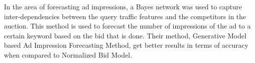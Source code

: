 In the area of forecasting ad impressions, a Bayes network was used to capture
inter-dependencies between the query traffic features and the competitors in the
auction\cite{nath2013ad}. This method is used to forecast the number of
impressions of the ad to a certain keyword based on the bid that is done. Their
method, Generative Model based Ad Impression Forecasting Method, get better
results in terms of accuracy when compared to Normalized Bid Model. 
